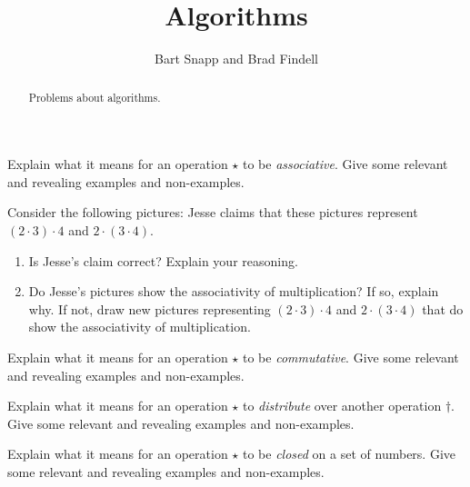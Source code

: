 \documentclass[nooutcomes]{ximera}
\title{Algorithms}
\author{Bart Snapp and Brad Findell}
\begin{document}
\begin{abstract}
Problems about algorithms. 
\end{abstract}
\maketitle



\begin{problem}Explain what it means for an operation $\star$ to be
  \textit{associative}. Give some relevant and revealing examples and non-examples.
\end{problem} 

\begin{problem}\label{P:MA}Consider the following pictures:
Jesse claims that these pictures represent $(2\cdot 3)\cdot 4$ and
$2\cdot (3\cdot 4)$.
\begin{enumerate}
\item Is Jesse's claim correct? Explain your reasoning.
\item Do Jesse's pictures show the associativity of multiplication? If
  so, explain why. If not, draw new pictures representing $(2\cdot
  3)\cdot 4$ and $2\cdot (3\cdot 4)$ that do show the associativity
  of multiplication.
\end{enumerate}
\end{problem} 

\begin{problem}Explain what it means for an operation $\star$ to be
  \textit{commutative}. Give some relevant and revealing examples  and non-examples.
\end{problem} 

\begin{problem}Explain what it means for an operation $\star$ to \textit{distribute}
  over another operation $\dagger$. Give some relevant and revealing
  examples and non-examples.
\end{problem} 

\begin{problem}Explain what it means for an operation $\star$ to be \textit{closed}
  on a set of numbers. Give some relevant and revealing
  examples and non-examples.
\end{problem} 
\end{document}
